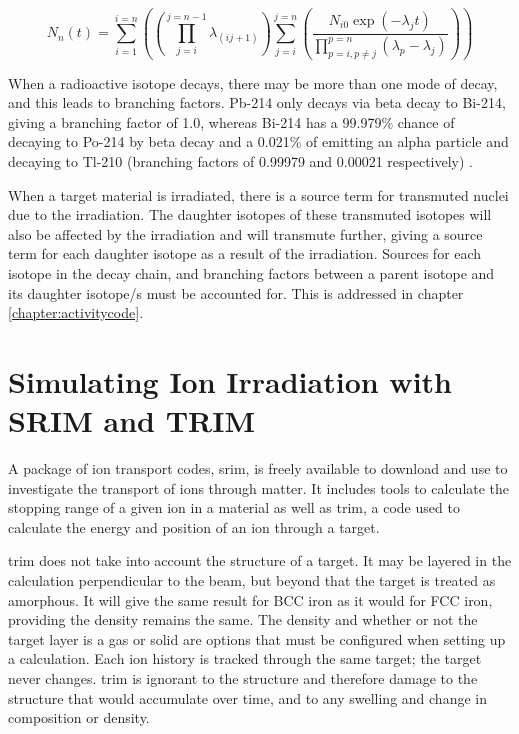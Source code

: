 \begin{equation}
N_{n}(t) = \sum_{i=1}^{i=n} \left( \left( \prod_{j=i}^{j=n-1} \lambda_{(ij+1)}\right) \sum_{j=i}^{j=n} \left(\frac{N_{i0}\exp(-\lambda_{j}t)}{\prod_{p=i,p\neq j}^{p=n} (\lambda_{p} - \lambda_{j})}\right)\right)
\label{eq:bateman}
\end{equation}

When a radioactive isotope decays, there may be more than one mode of decay, and this leads to branching factors.  Pb-214 only decays via beta decay to Bi-214, giving a branching factor of 1.0, whereas Bi-214 has a 99.979\% chance of decaying to Po-214 by beta decay and a 0.021\% of emitting an alpha particle and decaying to Tl-210 (branching factors of 0.99979 and 0.00021 respectively) \cite{jeff311}.

When a target material is irradiated, there is a source term for transmuted nuclei due to the irradiation.  The daughter isotopes of these transmuted isotopes will also be affected by the irradiation and will transmute further, giving a source term for each daughter isotope as a result of the irradiation.  Sources for each isotope in the decay chain, and branching factors between a parent isotope and its daughter isotope/s must be accounted for.  This is addressed in chapter \ref{chapter:activitycode}.





\section[Using SRIM and TRIM]{Simulating Ion Irradiation with SRIM and TRIM}
\label{section:srimtrim}

A package of ion transport codes, \acrshort{srim}, is freely available to download and use to investigate the transport of ions through matter.  It includes tools to calculate the stopping range of a given ion in a material as well as \acrlong{trim}, a code used to calculate the energy and position of an ion through a target.

\acrshort{trim} does not take into account the structure of a target.  It may be layered in the calculation perpendicular to the beam, but beyond that the target is treated as amorphous.  It will give the same result for BCC iron as it would for FCC iron, providing the density remains the same.  The density and whether or not the target layer is a gas or solid are options that must be configured when setting up a calculation.  Each ion history is tracked through the same target; the target never changes.  \acrshort{trim} is ignorant to the structure and therefore damage to the structure that would accumulate over time, and to any swelling and change in composition or density.

